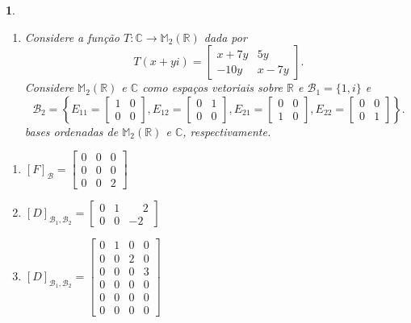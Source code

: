 \documentclass[12pt]{exam}
\newtheorem{exercicio}{}
\newcommand{\real}{\mathbb{R}}
\newcommand{\complex}{\mathbb{C}}
\newcommand{\cp}[1]{\mathbb{#1}}
\begin{document}
\begin{exercicio}
\begin{enumerate}[label=({\alph*})]
    \item Considere a fun\c{c}\~ao $T : \complex \to \cp{M}_2(\real)$ dada por
    \[
      T(x + yi) = \begin{bmatrix}
        x + 7y & 5y\\
        -10y & x - 7y
      \end{bmatrix}.
    \]
    Considere $\cp{M}_2(\real)$ e $\complex$ como espa\c{c}os vetoriais sobre $\real$ e $\mathcal{B}_1 = \{1, i\}$ e 
    \[
          \mathcal{B}_2 = \left\{E_{11} = \begin{bmatrix}
            1 & 0\\0 & 0
          \end{bmatrix}, E_{12} = \begin{bmatrix}
            0 & 1\\0 & 0
          \end{bmatrix}, E_{21} = \begin{bmatrix}
            0 & 0\\1 & 0
          \end{bmatrix}, E_{22} = \begin{bmatrix}
            0 & 0\\0 & 1
          \end{bmatrix}\right\}.
      \]
      bases ordenadas de $\cp{M}_2(\real)$ e $\complex$, respectivamente.
   \end{enumerate}
   \begin{solucao}
     \begin{enumerate}[label=({\alph*})]
        \item $[F]_\mathcal{B} = \begin{bmatrix}
           0 & 0 & 0\\
           0 & 0 & 0\\
           0 & 0 & 2
        \end{bmatrix}$

        \item $[D]_{\mathcal{B}_1, \mathcal{B}_2} = \begin{bmatrix}
          0 & 1 & \phantom{-}2\\
          0 & 0 & -2
        \end{bmatrix}$

        \item $[D]_{\mathcal{B}_1, \mathcal{B}_2} = \begin{bmatrix}
          0 & 1 & 0 & 0\\
          0 & 0 & 2 & 0\\
          0 & 0 & 0 & 3\\
          0 & 0 & 0 & 0\\
          0 & 0 & 0 & 0\\
          0 & 0 & 0 & 0
        \end{bmatrix}$


\end{enumerate}
\end{solucao}
\end{exercicio}
\end{document}
